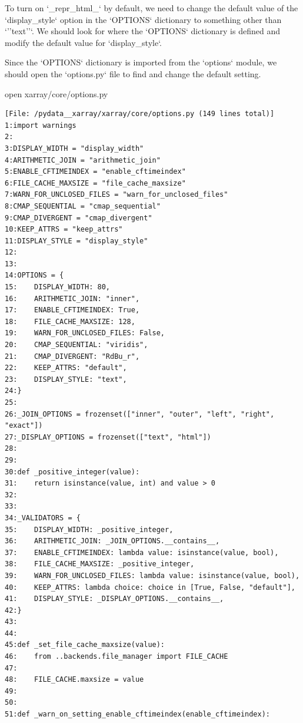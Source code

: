 {\begin{agentbox}
To turn on `\_repr\_html\_` by default, we need to change the default value of the `display\_style` option in the `OPTIONS` dictionary to something other than `''text''`. We should look for where the `OPTIONS` dictionary is defined and modify the default value for `display\_style`.



Since the `OPTIONS` dictionary is imported from the `options` module, we should open the `options.py` file to find and change the default setting.



\hrulefill
\begin{CodeVerbatim}[breaklines=true, breakanywhere=true]
open xarray/core/options.py
\end{CodeVerbatim}
\end{agentbox}
\begin{observationbox}\begin{Verbatim}[breaklines=true, breakanywhere=true]
[File: /pydata__xarray/xarray/core/options.py (149 lines total)]
1:import warnings
2:
3:DISPLAY_WIDTH = "display_width"
4:ARITHMETIC_JOIN = "arithmetic_join"
5:ENABLE_CFTIMEINDEX = "enable_cftimeindex"
6:FILE_CACHE_MAXSIZE = "file_cache_maxsize"
7:WARN_FOR_UNCLOSED_FILES = "warn_for_unclosed_files"
8:CMAP_SEQUENTIAL = "cmap_sequential"
9:CMAP_DIVERGENT = "cmap_divergent"
10:KEEP_ATTRS = "keep_attrs"
11:DISPLAY_STYLE = "display_style"
12:
13:
14:OPTIONS = {
15:    DISPLAY_WIDTH: 80,
16:    ARITHMETIC_JOIN: "inner",
17:    ENABLE_CFTIMEINDEX: True,
18:    FILE_CACHE_MAXSIZE: 128,
19:    WARN_FOR_UNCLOSED_FILES: False,
20:    CMAP_SEQUENTIAL: "viridis",
21:    CMAP_DIVERGENT: "RdBu_r",
22:    KEEP_ATTRS: "default",
23:    DISPLAY_STYLE: "text",
24:}
25:
26:_JOIN_OPTIONS = frozenset(["inner", "outer", "left", "right", "exact"])
27:_DISPLAY_OPTIONS = frozenset(["text", "html"])
28:
29:
30:def _positive_integer(value):
31:    return isinstance(value, int) and value > 0
32:
33:
34:_VALIDATORS = {
35:    DISPLAY_WIDTH: _positive_integer,
36:    ARITHMETIC_JOIN: _JOIN_OPTIONS.__contains__,
37:    ENABLE_CFTIMEINDEX: lambda value: isinstance(value, bool),
38:    FILE_CACHE_MAXSIZE: _positive_integer,
39:    WARN_FOR_UNCLOSED_FILES: lambda value: isinstance(value, bool),
40:    KEEP_ATTRS: lambda choice: choice in [True, False, "default"],
41:    DISPLAY_STYLE: _DISPLAY_OPTIONS.__contains__,
42:}
43:
44:
45:def _set_file_cache_maxsize(value):
46:    from ..backends.file_manager import FILE_CACHE
47:
48:    FILE_CACHE.maxsize = value
49:
50:
51:def _warn_on_setting_enable_cftimeindex(enable_cftimeindex):

\end{Verbatim}
\end{observationbox}}
